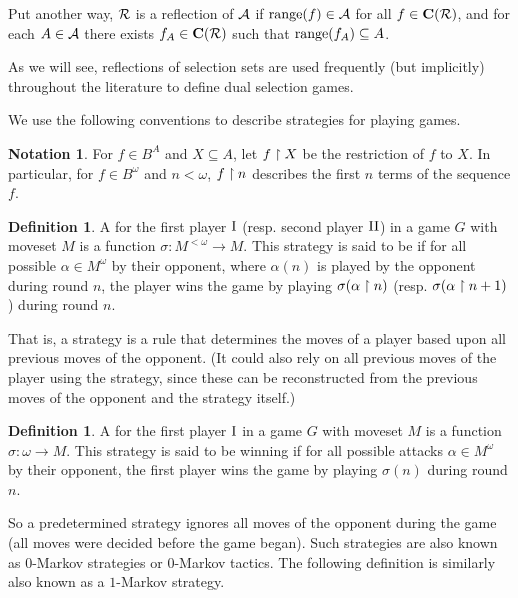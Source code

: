 \documentclass{amsart}
\theoremstyle{plain}
\theoremstyle{definition}
\newtheorem{definition}[theorem]{Definition}
\newtheorem{notation}[theorem]{Notation}
\theoremstyle{remark}
\theoremstyle{plain}
\theoremstyle{definition}
\theoremstyle{remark}
\begin{document}
Put another way, \(\mathcal{R}\) is a reflection of \(\mathcal{A}\) if \(\text{range}(f)\in\mathcal{A}\) 
for all \(f\in\mathbf C(\mathcal{R})\), and for each \(A\in\mathcal{A}\) there exists
\(f_A\in\mathbf C(\mathcal{R})\) such that \(\text{range}(f_A)\subseteq A\).

As we will see, reflections of selection sets are used frequently (but implicitly) 
throughout the literature to define dual selection games.

We use the following conventions to describe strategies for playing games.

\begin{notation}
  For \(f\in B^A\) and \(X\subseteq A\), let \(f\restriction X\) be the restriction of \(f\)
  to \(X\). In particular, for \(f\in B^\omega\) and \(n<\omega\), \(f\restriction n\)
  describes the first \(n\) terms of the sequence \(f\).
\end{notation}

\begin{definition}
  A  for the first player \(\mathrm{I}\) (resp. second player \(\mathrm{II}\))
  in a game \(G\) with moveset \(M\) is a function
  \(\sigma:M^{<\omega}\to M\). This strategy is said to be  if
  for all possible  \(\alpha\in M^\omega\) by their opponent,
  where \(\alpha(n)\) is played by the opponent during round \(n\),
  the player wins the game by playing \(\sigma(\alpha\restriction n)\)
  (resp. \(\sigma(\alpha\restriction n+1)\)) during round \(n\).
\end{definition}

That is, a strategy is a rule that determines the moves of a player based upon
all previous moves of the opponent. (It could also rely on all previous
moves of the player using the strategy, since these can be reconstructed from
the previous moves of the opponent and the strategy itself.)

\begin{definition}
  A  for the first player \(\mathrm{I}\)
  in a game \(G\) with moveset \(M\) is a function
  \(\sigma:\omega\to M\). This strategy is said to be winning if
  for all possible attacks \(\alpha\in M^\omega\) by their opponent,
  the first player wins the game by playing \(\sigma(n)\)
  during round \(n\).
\end{definition}

So a predetermined strategy ignores all moves of the opponent during the
game (all moves were decided before the game began). Such strategies
are also known as \(0\)-Markov strategies or \(0\)-Markov tactics.
The following definition is similarly also known as a \(1\)-Markov strategy.
\end{document}
